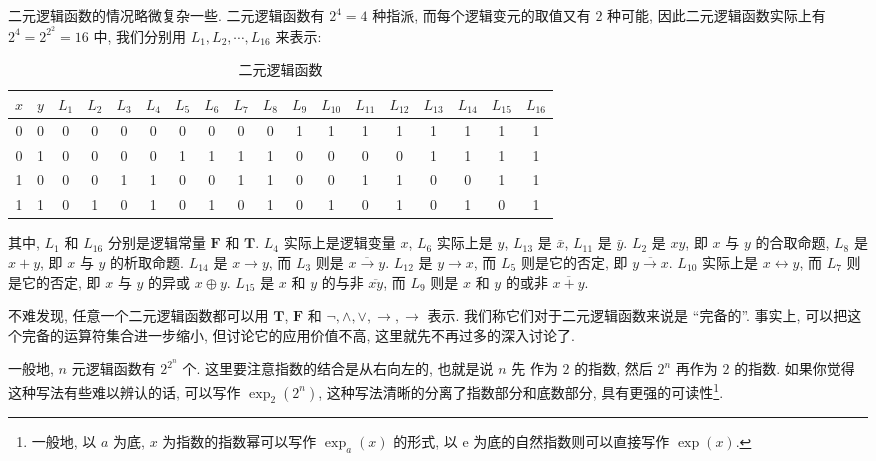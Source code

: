 \documentclass[10pt,UTF8]{book} %
\begin{document}
二元逻辑函数的情况略微复杂一些. 二元逻辑函数有 $2^4 = 4$ 种指派, 而每个逻辑变元的取值又有
$2$ 种可能, 因此二元逻辑函数实际上有 $2^4 = 2^{2^2} = 16$ 中, 我们分别用
$L_1, L_2, \cdots, L_{16}$ 来表示:
\begin{table}[H]
    \centering
    \caption{二元逻辑函数}
    \begin{tabular}{cc|cccccccccccccccc}
        \toprule
        $x$ & $y$ & $L_1$ & $L_2$ & $L_3$ & $L_4$ & $L_5$ & $L_6$ & $L_7$ & $L_8$ & $L_9$ & $L_{10}$ & $L_{11}$ & $L_{12}$ & $L_{13}$ & $L_{14}$ & $L_{15}$ & $L_{16}$ \\
        \midrule
        0 & 0 & 0 & 0 & 0 & 0 & 0 & 0 & 0 & 0 & 1 & 1 & 1 & 1 & 1 & 1 & 1 & 1 \\
        0 & 1 & 0 & 0 & 0 & 0 & 1 & 1 & 1 & 1 & 0 & 0 & 0 & 0 & 1 & 1 & 1 & 1 \\
        1 & 0 & 0 & 0 & 1 & 1 & 0 & 0 & 1 & 1 & 0 & 0 & 1 & 1 & 0 & 0 & 1 & 1 \\
        1 & 1 & 0 & 1 & 0 & 1 & 0 & 1 & 0 & 1 & 0 & 1 & 0 & 1 & 0 & 1 & 0 & 1 \\
        \bottomrule
    \end{tabular}
\end{table}

其中, $L_1$ 和 $L_{16}$ 分别是逻辑常量 $\mathbf{F}$ 和 $\mathbf{T}$.
$L_4$ 实际上是逻辑变量 $x$, $L_6$ 实际上是 $y$, $L_{13}$ 是 $\bar x$, $L_{11}$ 是
$\bar y$. $L_2$ 是 $xy$, 即 $x$ 与 $y$ 的合取命题, $L_8$ 是 $x+y$, 即 $x$ 与 $y$
的析取命题. $L_{14}$ 是 $x \to y$, 而 $L_3$ 则是 $\overline{x \to y}$.
$L_{12}$ 是 $y \to x$, 而 $L_5$ 则是它的否定, 即 $\overline{y \to x}$.
$L_{10}$ 实际上是 $x \leftrightarrow y$, 而 $L_{7}$ 则是它的否定, 即 $x$ 与 $y$
的异或 $x \oplus y$. $L_{15}$ 是 $x$ 和 $y$ 的与非 $\overline{xy}$,
而 $L_9$ 则是 $x$ 和 $y$ 的或非 $\overline{x+y}$.

不难发现, 任意一个二元逻辑函数都可以用 $\mathbf{T}$, $\mathbf{F}$ 和 $\lnot,
\wedge, \vee, \to, \rightarrow$ 表示. 我们称它们对于二元逻辑函数来说是 “完备的”.
事实上, 可以把这个完备的运算符集合进一步缩小, 但讨论它的应用价值不高, 这里就先不再过多的深入讨论了.

一般地, $n$ 元逻辑函数有 $2^{2^n}$ 个. 这里要注意指数的结合是从右向左的, 也就是说 $n$ 先
作为 $2$ 的指数, 然后 $2^n$ 再作为 $2$ 的指数. 如果你觉得这种写法有些难以辨认的话,
可以写作 $\exp_2(2^n)$, 这种写法清晰的分离了指数部分和底数部分, 具有更强的可读性\footnote{
    一般地, 以 $a$ 为底, $x$ 为指数的指数幂可以写作 $\exp_a(x)$ 的形式, 以 $\mathrm{e}$
    为底的自然指数则可以直接写作 $\exp(x)$.
}.
\end{document}
